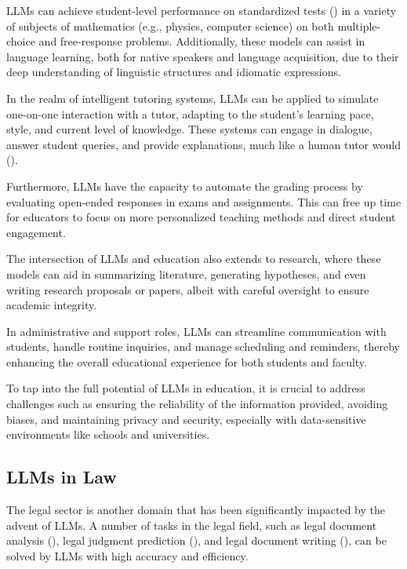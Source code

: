 LLMs can achieve student-level performance on standardized tests (\textcite{gpt4}) in a variety of subjects of mathematics (e.g., physics, computer science) on both multiple-choice and free-response problems.
Additionally, these models can assist in language learning, both for native speakers and language acquisition, due to their deep understanding of linguistic structures and idiomatic expressions.

In the realm of intelligent tutoring systems, LLMs can be applied to simulate one-on-one interaction with a tutor, adapting to the student's learning pace, style, and current level of knowledge.
These systems can engage in dialogue, answer student queries, and provide explanations, much like a human tutor would (\textcite{malinka2023educationalimpact,susnjak2022chatgpt}).

Furthermore, LLMs have the capacity to automate the grading process by evaluating open-ended responses in exams and assignments.
This can free up time for educators to focus on more personalized teaching methods and direct student engagement.

The intersection of LLMs and education also extends to research, where these models can aid in summarizing literature, generating hypotheses, and even writing research proposals or papers, albeit with careful oversight to ensure academic integrity.

In administrative and support roles, LLMs can streamline communication with students, handle routine inquiries, and manage scheduling and reminders, thereby enhancing the overall educational experience for both students and faculty.

To tap into the full potential of LLMs in education, it is crucial to address challenges such as ensuring the reliability of the information provided, avoiding biases, and maintaining privacy and security, especially with data-sensitive environments like schools and universities.

\subsection{LLMs in Law}
\label{subsec:llms-in-law}


The legal sector is another domain that has been significantly impacted by the advent of LLMs.
A number of tasks in the legal field, such as legal document analysis (\textcite{blairstanek2023gpt3statutory}), legal judgment prediction (\textcite{trautmann2022legalprompt}), and legal document writing (\textcite{choi2023chatgptlaw}), can be solved by LLMs with high accuracy and efficiency.

